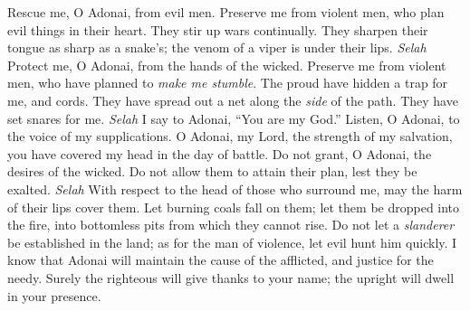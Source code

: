 \begin{biblechapter} %
 Rescue me, O Adonai, from evil men. 
Preserve me from violent men,
\verse who plan evil things in their heart. 
They stir up wars continually.
\verse They sharpen their tongue as sharp as a snake’s; 
the venom of a viper is under their lips. \textit{Selah}
\verse Protect me, O Adonai, from the hands of the wicked. 
Preserve me from violent men, 
who have planned to \textit{make me stumble}.
\verse The proud have hidden a trap for me, and cords. 
They have spread out a net along the \textit{side} of the path. 
They have set snares for me. \textit{Selah}
\verse I say to Adonai, “You are my God.” 
Listen, O Adonai, to the voice of my supplications.
\verse O Adonai, my Lord, the strength of my salvation, 
you have covered my head in the day of battle.
\verse Do not grant, O Adonai, the desires of the wicked. 
Do not allow them to attain their plan, lest they be exalted. \textit{Selah}
\verse With respect to the head of those who surround me, 
may the harm of their lips cover them.
\verse Let burning coals fall on them; 
let them be dropped into the fire, 
into bottomless pits from which they cannot rise.
\verse Do not let a \textit{slanderer} be established in the land; 
as for the man of violence, let evil hunt him quickly.
\verse I know that Adonai will maintain the cause of the afflicted, 
and justice for the needy.
\verse Surely the righteous will give thanks to your name; 
the upright will dwell in your presence.
\end{biblechapter}

